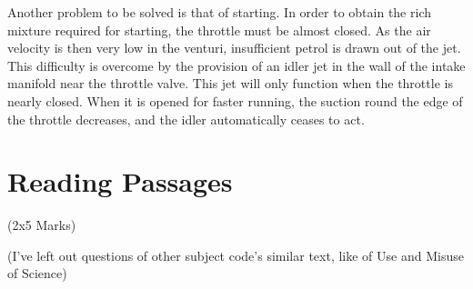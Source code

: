\documentclass[12pt]{article}
\begin{document}
\begin{enumerate}
      Another problem to be solved is that of starting. In order to obtain the rich mixture required for starting, the throttle must be almost closed. As the air velocity is then very low in the venturi, insufficient petrol is drawn out of the jet. This difficulty is overcome by the provision of an idler jet in the wall of the intake manifold near the throttle valve. This jet will only function when the throttle is nearly closed. When it is opened for faster running, the suction round the edge of the throttle decreases, and the idler automatically ceases to act.
  \end{enumerate}

\pagebreak

\section{Reading Passages}
  \begin{center}(2x5 Marks)\end{center}

  {\footnotesize (I've left out questions of other subject code's similar text, like of Use and Misuse of Science)}
\end{document}
